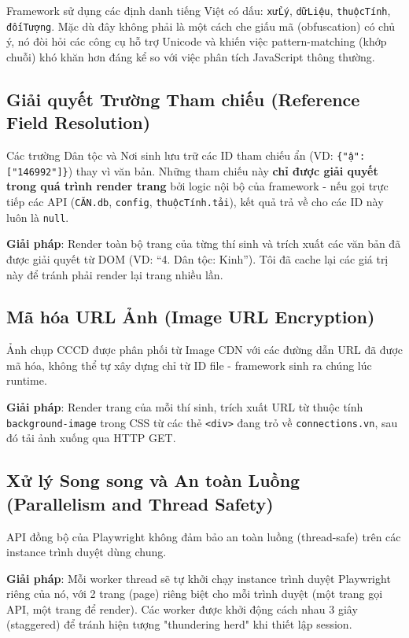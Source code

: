 \documentclass[12pt,a4paper]{article}
\begin{document}
Framework sử dụng các định danh tiếng Việt có dấu: \texttt{xửLý}, \texttt{dữLiệu}, \texttt{thuộcTính}, \texttt{đốiTượng}. Mặc dù đây không phải là một cách che giấu mã (obfuscation) có chủ ý, nó đòi hỏi các công cụ hỗ trợ Unicode và khiến việc pattern-matching (khớp chuỗi) khó khăn hơn đáng kể so với việc phân tích JavaScript thông thường.

\subsection{Giải quyết Trường Tham chiếu (Reference Field Resolution)}

Các trường Dân tộc và Nơi sinh lưu trữ các ID tham chiếu ẩn (VD: \texttt{\{"ậ":["146992"]\}}) thay vì văn bản. Những tham chiếu này \textbf{chỉ được giải quyết trong quá trình render trang} bởi logic nội bộ của framework - nếu gọi trực tiếp các API (\texttt{CĂN.db}, \texttt{config}, \texttt{thuộcTính.tải}), kết quả trả về cho các ID này luôn là \texttt{null}.

\textbf{Giải pháp}: Render toàn bộ trang của từng thí sinh và trích xuất các văn bản đã được giải quyết từ DOM (VD: ``4. Dân tộc: Kinh''). Tôi đã cache lại các giá trị này để tránh phải render lại trang nhiều lần.

\subsection{Mã hóa URL Ảnh (Image URL Encryption)}

Ảnh chụp CCCD được phân phối từ Image CDN với các đường dẫn URL đã được mã hóa, không thể tự xây dựng chỉ từ ID file - framework sinh ra chúng lúc runtime.

\textbf{Giải pháp}: Render trang của mỗi thí sinh, trích xuất URL từ thuộc tính \texttt{background-image} trong CSS từ các thẻ \texttt{<div>} đang trỏ về \texttt{connections.vn}, sau đó tải ảnh xuống qua HTTP GET.

\subsection{Xử lý Song song và An toàn Luồng (Parallelism and Thread Safety)}

API đồng bộ của Playwright không đảm bảo an toàn luồng (thread-safe) trên các instance trình duyệt dùng chung.

\textbf{Giải pháp}: Mỗi worker thread sẽ tự khởi chạy instance trình duyệt Playwright riêng của nó, với 2 trang (page) riêng biệt cho mỗi trình duyệt (một trang gọi API, một trang để render). Các worker được khởi động cách nhau 3 giây (staggered) để tránh hiện tượng "thundering herd" khi thiết lập session.
\end{document}
